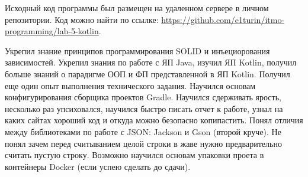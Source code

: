 Исходный код программы был размещен на удаленном сервере в личном репозитории. Код можно найти по ссылке: \url{https://github.com/e1turin/itmo-programming/lab-5-kotlin}.


Укрепил знание принципов программирования SOLID и инъециорования зависимостей. Укрепил знания по работе с ЯП Java, изучил ЯП Kotlin, получил больше знаний о парадигме ООП и ФП представленной в ЯП Kotlin. Получил еще один опыт выполнения технического задания. Научился основам конфигурирования сборщика проектов Gradle. Научился сдерживать ярость, несколько раз упсиховался, научился быстро писать отчет к работе, узнал на каких сайтах хороший код и откуда можно безопасно копипастить. Понял отличия между библиотеками по работе с JSON: Jackson и Gson (второй круче). Не понял зачем перед считыванием целой строки в жаве нужно предварительно считать пустую строку. Возможно научился основам упаковки проета в контейнеры Docker (если успею сделать до сдачи).\\
\newpage





